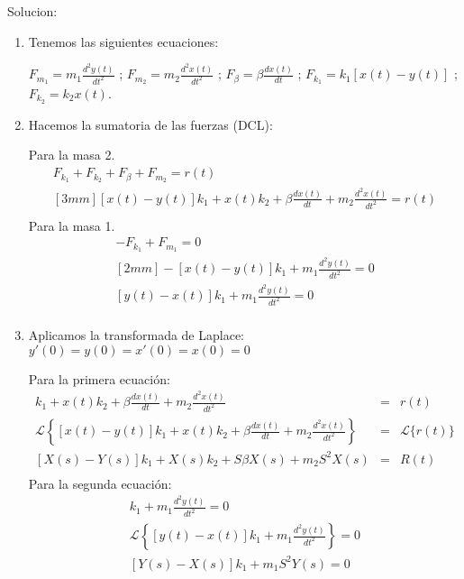 \documentclass[12pt]{article}
\begin{document}
Solucion:
\begin{enumerate}
  \item Tenemos las siguientes ecuaciones:

    \(\displaystyle F_{m_{1}}=m_{1}\frac{d^{2}y(t)}{dt^{2}}\) ; 
    \(\displaystyle F_{m_{2}}=m_{2}\frac{d^{2}x(t)}{dt^{2}}\) ; 
    \(\displaystyle F_{\beta}=\beta\frac{dx(t)}{dt}\) ; 
    \(\displaystyle F_{k_{1}}=k_{1}[x(t)-y(t)]\) ; 
    \(\displaystyle F_{k_{2}}=k_{2}x(t)\).

  \item Hacemos la sumatoria de las fuerzas (DCL):

    Para la masa 2.
    \begin{eqnarray*}
      F_{k_{1}} + F_{k_{2}} + F_{\beta} + F_{m_{2}} = r(t) \\ [3mm]
      [x(t)-y(t)]k_{1} + x(t)k_{2} + \beta\frac{dx(t)}{dt} + m_{2}\frac{d^{2}x(t)}{dt^{2}} = r(t) \\[3mm]
    \end{eqnarray*}
    Para la masa 1.
    \begin{eqnarray*}
      -F_{k_{1}} + F_{m_{1}} = 0 \\ [2mm]
      -[x(t)-y(t)]k_{1} + m_{1}\frac{d^{2}y(t)}{dt^{2}} = 0 \\[2mm]
      [y(t)-x(t)]k_{1} + m_{1}\frac{d^{2}y(t)}{dt^{2}} = 0 \\[2mm]
    \end{eqnarray*}

  \item Aplicamos la transformada de Laplace: \(\displaystyle y'(0)=y(0)=x'(0)=x(0)=0\)

    Para la primera ecuaci\'on:
    \begin{eqnarray*}
      [x(t)-y(t)]k_{1} + x(t)k_{2} + \beta\frac{dx(t)}{dt} + m_{2}\frac{d^{2}x(t)}{dt^{2}} &=& r(t) \\[3mm]
      \mathscr{L} \left \{[x(t)-y(t)]k_{1} + x(t)k_{2} + \beta\frac{dx(t)}{dt} + m_{2}\frac{d^{2}x(t)}{dt^{2}} \right \} &=& \mathscr{L}\{r(t)\} \\[3mm]
      [X(s)-Y(s)]k_{1} + X(s)k_{2} + S\beta X(s) + m_{2}S^{2}X(s) &=& R(t) \\[3mm]
    \end{eqnarray*}
    Para la segunda ecuaci\'on:
    \begin{eqnarray*}
      [y(t)-x(t)]k_{1} + m_{1}\frac{d^{2}y(t)}{dt^{2}} = 0 \\[2mm]
      \mathscr{L}\left\{[y(t)-x(t)]k_{1} + m_{1}\frac{d^{2}y(t)}{dt^{2}}\right\} = 0 \\[2mm]
      [Y(s)-X(s)]k_{1} + m_{1}S^{2}Y(s) = 0 \\[2mm]
    \end{eqnarray*}


\end{enumerate}
\end{document}
